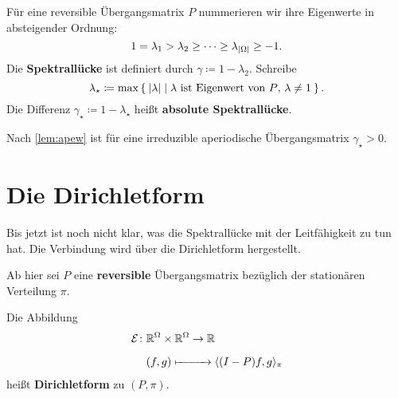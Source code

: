 \documentclass[ngerman,a4paper,11pt]{scrartcl}
\newcommand{\diri}{\mathcal{E}}
\newcommand{\RR}{\mathbb{R}}
\DeclarePairedDelimiter{\sprod}{\langle}{\rangle}	%
\DeclarePairedDelimiter{\abs}{\lvert}{\rvert}		%
\begin{document}
\begin{defn}
 Für eine reversible Übergangsmatrix $P$ nummerieren wir ihre Eigenwerte in
 absteigender Ordnung:
 \begin{equation*}
  1=\lambda_1>\lambda_2\geq\dotsb\geq\lambda_{\abs{\Omega}}\geq -1.
 \end{equation*}
 Die \textbf{Spektrallücke} ist definiert durch $\gamma\coloneqq 1-\lambda_2$.
 Schreibe
 \begin{equation*}
  \lambda_\star\coloneqq\max\Set{\abs{\lambda}\mid\text{$\lambda$ ist Eigenwert von $P$, $\lambda\neq 1$}}. 
 \end{equation*}
  Die Differenz $\gamma_\star\coloneqq 1-\lambda_\star$ heißt \textbf{absolute Spektrallücke}.
\end{defn}

\begin{rem}
 Nach \cref{lem:apew} ist für eine irreduzible aperiodische Übergangsmatrix $\gamma_\star>0$. 
\end{rem}

\section{Die Dirichletform}
Bis jetzt ist noch nicht klar, was die Spektrallücke mit der Leitfähigkeit zu
tun hat. Die Verbindung wird über die Dirichletform hergestellt.

Ab hier sei $P$ eine \textbf{reversible} Übergangsmatrix bezüglich der
stationären Verteilung $\pi$.

\begin{defn}
  Die Abbildung
  \begin{align*}
   \diri \colon &\RR^\Omega\times\RR^\Omega \to\RR \\
   &(f,g)\xmapsto{\phantom{\RR^\Omega\times\RR^\Omega}}\sprod{(I-P)f,g}_\pi
  \end{align*}
  heißt \textbf{Dirichletform} zu $(P,\pi)$.
\end{defn}
\end{document}
